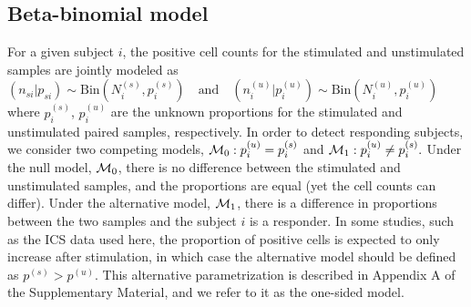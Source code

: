\documentclass[12pt,oupdraft]{biostatistics}
\begin{document}
\subsection{Beta-binomial model}
\label{s:DE}
For a given subject $i$, the positive cell counts for the stimulated and unstimulated samples are jointly modeled as $(n_{si}|p_{si}) \sim \mathrm{Bin}(N^{(s)}_{i},p^{(s)}_{i})\quad \text{and}\quad (n^{(u)}_{i}|p^{(u)}_{i}) \sim \mathrm{Bin}(N^{(u)}_{i},p^{(u)}_{i})\label{eq:bino_likelihood}$ where $p^{(s)}_{i}$, $p^{(u)}_{i}$ are the unknown proportions for the stimulated and unstimulated paired samples, respectively. In order to detect responding subjects, we consider two competing models,
${\cal M}_0: p^{(u)}_{i}=p^{(s)}_{i}$ and ${\cal M}_1: p^{(u)}_{i}\ne p^{(s)}_{i}. \label{eq:models}$
Under the null model, ${\cal M}_0$, there is no difference between the stimulated and unstimulated samples, and the proportions are equal (yet the cell counts can differ). Under the alternative model, ${\cal M}_1$, there is a difference in proportions between the two samples and the subject $i$ is a responder. In some studies, such as the ICS data used here, the proportion of positive cells is expected to only increase after stimulation, in which case the alternative model should be defined as $p^{(s)}>p^{(u)}$. This alternative parametrization is described in Appendix A of the Supplementary Material, and we refer to it as the one-sided model.
\end{document}
